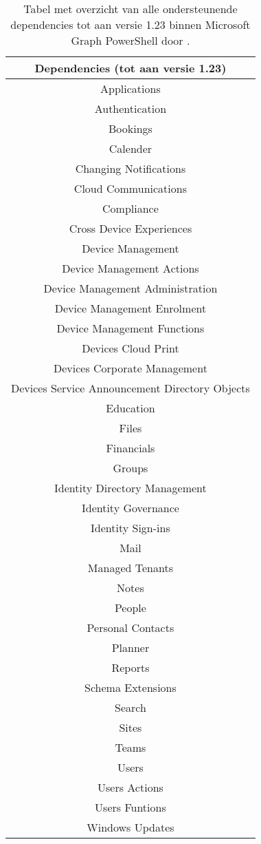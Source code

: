 \begin{table}
    \small
    \centering
    \begin{tabular}{ |c| } 
        \hline
        \textbf{Dependencies (tot aan versie 1.23)} \\
        \hline
        Applications \\
        Authentication \\
        Bookings \\
        Calender \\
        Changing Notifications \\
        Cloud Communications \\
        Compliance \\
        Cross Device Experiences \\
        Device Management \\
        Device Management Actions \\
        Device Management Administration \\
        Device Management Enrolment \\
        Device Management Functions \\
        Devices Cloud Print \\
        Devices Corporate Management \\
        Devices Service Announcement
        Directory Objects \\
        Education \\
        Files \\
        Financials \\
        Groups \\
        Identity Directory Management \\
        Identity Governance \\
        Identity Sign-ins \\
        Mail \\
        Managed Tenants \\
        Notes \\
        People \\
        Personal Contacts \\
        Planner \\
        Reports \\
        Schema Extensions \\
        Search \\
        Sites \\
        Teams \\
        Users \\
        Users Actions \\
        Users Funtions \\
        Windows Updates \\
        \hline
    \end{tabular}
    \caption[Tabel Microsoft Graph dependencies]{Tabel met overzicht van alle ondersteunende dependencies tot aan versie 1.23 binnen Microsoft Graph PowerShell door \textcite{Microsoft2023k}.}
    \label{MSGDT}
\end{table}

